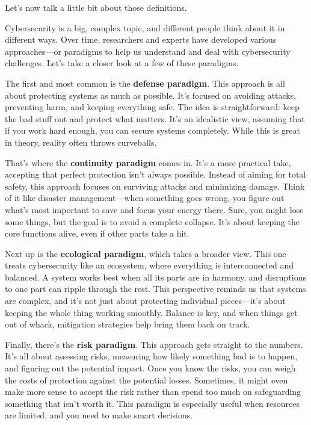 Let's now talk a little bit about those definitions.

Cybersecurity is a big, complex topic, and different people think
about it in different ways. Over time, researchers and experts have
developed various approaches—or paradigms to help us understand and
deal with cybersecurity challenges. Let’s take a closer look at a few
of these paradigms.

The first and most common is the \textbf{defense paradigm}. This
approach is all about protecting systems as much as possible. It’s
focused on avoiding attacks, preventing harm, and keeping everything
safe. The idea is straightforward: keep the bad stuff out and protect
what matters. It’s an idealistic view, assuming that if you work hard
enough, you can secure systems completely. While this is great in
theory, reality often throws curveballs.

That’s where the \textbf{continuity paradigm} comes in. It’s a more
practical take, accepting that perfect protection isn’t always
possible. Instead of aiming for total safety, this approach focuses on
surviving attacks and minimizing damage. Think of it like disaster
management—when something goes wrong, you figure out what’s most
important to save and focus your energy there. Sure, you might lose
some things, but the goal is to avoid a complete collapse. It’s about
keeping the core functions alive, even if other parts take a hit.

Next up is the \textbf{ecological paradigm}, which takes a broader view.
This one treats cybersecurity like an ecosystem, where everything is
interconnected and balanced. A system works best when all its parts are
in harmony, and disruptions to one part can ripple through the rest.
This perspective reminds us that systems are complex, and it’s not just
about protecting individual pieces—it’s about keeping the whole thing
working smoothly. Balance is key, and when things get out of whack,
mitigation strategies help bring them back on track.

Finally, there’s the \textbf{risk paradigm}. This approach gets
straight to the numbers. It’s all about assessing risks, measuring how
likely something bad is to happen, and figuring out the potential
impact. Once you know the risks, you can weigh the costs of protection
against the potential losses. Sometimes, it might even make more sense
to accept the risk rather than spend too much on safeguarding something
that isn’t worth it. This paradigm is especially useful when resources
are limited, and you need to make smart decisions.

